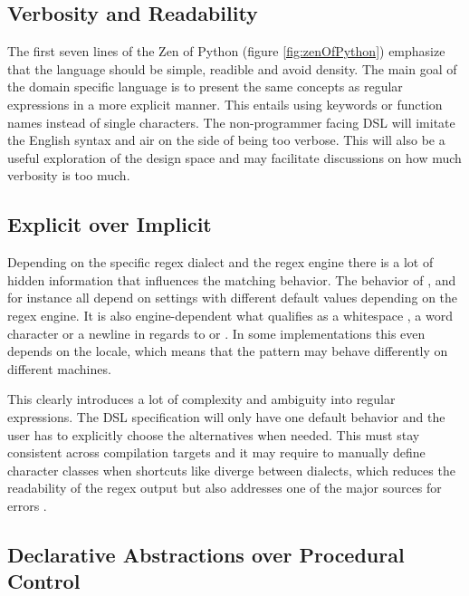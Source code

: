 \subsection{Verbosity and Readability}

The first seven lines of the Zen of Python (figure \ref{fig:zenOfPython}) emphasize that the language should be simple, readible and avoid density. The main goal of the domain specific language is to present the same concepts as regular expressions in a more explicit manner. This entails using keywords or function names instead of single characters. The non-programmer facing DSL will imitate the English syntax and air on the side of being too verbose. This will also be a useful exploration of the design space and may facilitate discussions on how much verbosity is too much.

\subsection{Explicit over Implicit} \label{sec:explicitOverImplicit}

Depending on the specific regex dialect and the regex engine there is a lot of hidden information that influences the matching behavior. The behavior of \pattern{\caret}, \pattern{\$} and  for instance all depend on settings with different default values depending on the regex engine. It is also engine-dependent what qualifies as a whitespace , a word character  or a newline in regards to \pattern{\caret} or \pattern{\$}. In some implementations this even depends on the locale, which means that the pattern may behave differently on different machines.

This clearly introduces a lot of complexity and ambiguity into regular expressions. The DSL specification will only have one default behavior and the user has to explicitly choose the alternatives when needed. This must stay consistent across compilation targets and it may require to manually define character classes when shortcuts like  diverge between dialects, which reduces the readability of the regex output but also addresses one of the major sources for errors \cite{RegexNotLinguaFranca}.

\subsection{Declarative Abstractions over Procedural Control} \label{sec:declarativeOverImparative}

